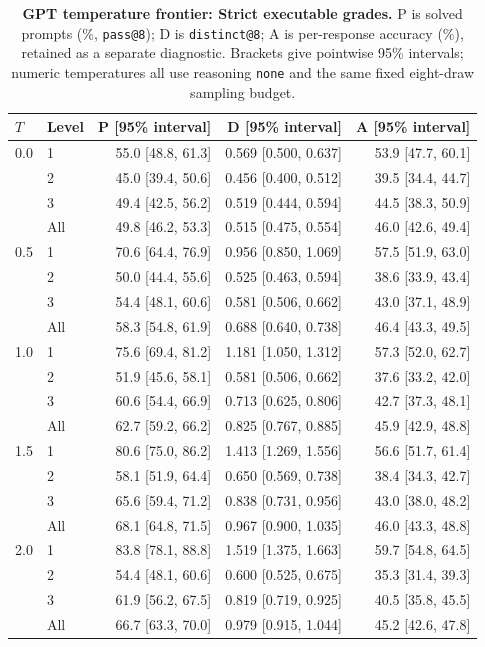 \begin{table}[!htbp]
\centering
\setlength{\parfillskip}{0pt plus .20\linewidth}
\caption{\textbf{GPT temperature frontier: Strict executable grades.}
P is solved prompts (\%, \texttt{pass@8}); D is \texttt{distinct@8};
A is per-response accuracy (\%), retained as a separate diagnostic.
Brackets give pointwise 95\% intervals;
numeric temperatures all use reasoning \texttt{none} and the same fixed eight-draw sampling budget.}
\small
\setlength{\tabcolsep}{4pt}
\begin{tabular}{@{}llrrr@{}}
\toprule
$T$ & Level & P [95\% interval] & D [95\% interval] & A [95\% interval] \\
\midrule
0.0 & 1 & 55.0 [48.8, 61.3] & 0.569 [0.500, 0.637] & 53.9 [47.7, 60.1] \\
 & 2 & 45.0 [39.4, 50.6] & 0.456 [0.400, 0.512] & 39.5 [34.4, 44.7] \\
 & 3 & 49.4 [42.5, 56.2] & 0.519 [0.444, 0.594] & 44.5 [38.3, 50.9] \\
 & All & 49.8 [46.2, 53.3] & 0.515 [0.475, 0.554] & 46.0 [42.6, 49.4] \\
0.5 & 1 & 70.6 [64.4, 76.9] & 0.956 [0.850, 1.069] & 57.5 [51.9, 63.0] \\
 & 2 & 50.0 [44.4, 55.6] & 0.525 [0.463, 0.594] & 38.6 [33.9, 43.4] \\
 & 3 & 54.4 [48.1, 60.6] & 0.581 [0.506, 0.662] & 43.0 [37.1, 48.9] \\
 & All & 58.3 [54.8, 61.9] & 0.688 [0.640, 0.738] & 46.4 [43.3, 49.5] \\
1.0 & 1 & 75.6 [69.4, 81.2] & 1.181 [1.050, 1.312] & 57.3 [52.0, 62.7] \\
 & 2 & 51.9 [45.6, 58.1] & 0.581 [0.506, 0.662] & 37.6 [33.2, 42.0] \\
 & 3 & 60.6 [54.4, 66.9] & 0.713 [0.625, 0.806] & 42.7 [37.3, 48.1] \\
 & All & 62.7 [59.2, 66.2] & 0.825 [0.767, 0.885] & 45.9 [42.9, 48.8] \\
1.5 & 1 & 80.6 [75.0, 86.2] & 1.413 [1.269, 1.556] & 56.6 [51.7, 61.4] \\
 & 2 & 58.1 [51.9, 64.4] & 0.650 [0.569, 0.738] & 38.4 [34.3, 42.7] \\
 & 3 & 65.6 [59.4, 71.2] & 0.838 [0.731, 0.956] & 43.0 [38.0, 48.2] \\
 & All & 68.1 [64.8, 71.5] & 0.967 [0.900, 1.035] & 46.0 [43.3, 48.8] \\
2.0 & 1 & 83.8 [78.1, 88.8] & 1.519 [1.375, 1.663] & 59.7 [54.8, 64.5] \\
 & 2 & 54.4 [48.1, 60.6] & 0.600 [0.525, 0.675] & 35.3 [31.4, 39.3] \\
 & 3 & 61.9 [56.2, 67.5] & 0.819 [0.719, 0.925] & 40.5 [35.8, 45.5] \\
 & All & 66.7 [63.3, 70.0] & 0.979 [0.915, 1.044] & 45.2 [42.6, 47.8] \\
\bottomrule
\end{tabular}
\end{table}

